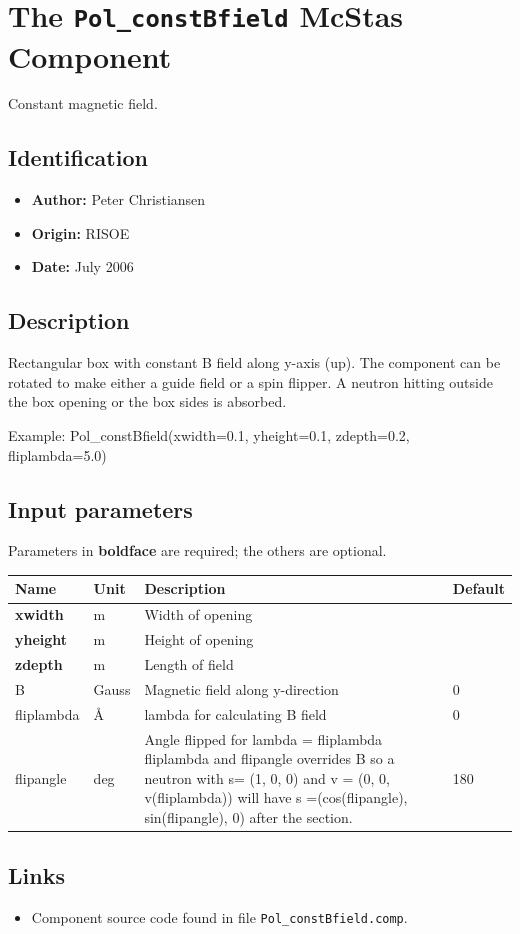 \section{The \texttt{Pol\_constBfield} McStas Component}
Constant magnetic field.

\subsection*{Identification}
\begin{itemize}
  \item \textbf{Author:} Peter Christiansen
  \item \textbf{Origin:} RISOE
  \item \textbf{Date:} July 2006
\end{itemize}

\subsection*{Description}
Rectangular box with constant B field along y-axis (up). The component can be rotated to make either a guide field or a spin flipper. A neutron hitting outside the box opening or the box sides is absorbed.

Example: Pol\_constBfield(xwidth=0.1, yheight=0.1, zdepth=0.2, fliplambda=5.0)

\subsection*{Input parameters}
Parameters in \textbf{boldface} are required; the others are optional.

\begin{longtable}{p{}p{}p{}p{}}
\toprule
\textbf{Name} & \textbf{Unit} & \textbf{Description} & \textbf{Default} \\
\midrule
\endhead
\textbf{xwidth} & m & Width of opening &  \\
\textbf{yheight} & m & Height of opening &  \\
\textbf{zdepth} & m & Length of field &  \\
B & Gauss & Magnetic field along y-direction & 0 \\
fliplambda & \AA{} & lambda for calculating B field & 0 \\
flipangle & deg & Angle flipped for lambda = fliplambda fliplambda and flipangle overrides B so a neutron with s= (1, 0, 0) and v = (0, 0, v(fliplambda)) will have s =(cos(flipangle), sin(flipangle), 0) after the section. & 180 \\
\bottomrule
\end{longtable}

\subsection*{Links}
\begin{itemize}
  \item Component source code found in file \texttt{Pol\_constBfield.comp}.
\end{itemize}
